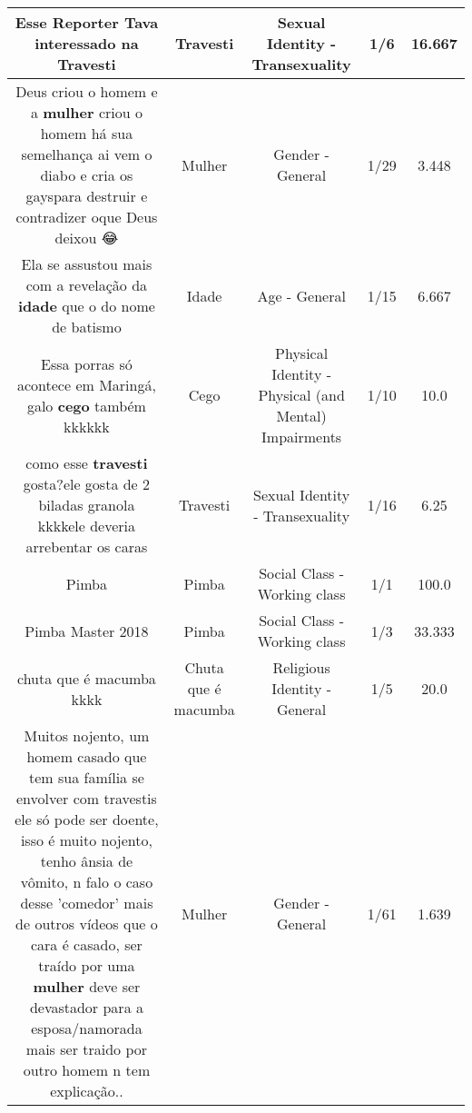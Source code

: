 \documentclass[11pt]{article}
\newlength\mylength
\begin{document}
\begin{center}
\begin{longtable}{|C{.65\mylength}|C{.30\mylength}|C{.12\mylength}|C{.12\mylength}|C{.12\mylength}|}
  \small Esse Reporter Tava interessado na Travesti\normalsize   & Travesti & Sexual Identity - Transexuality & 1/6 & 16.667 \\  \hline
  \small Deus criou o homem e  a \textbf{mulher} criou o homem há sua semelhança ai vem o diabo e cria os gayspara destruir e contradizer oque Deus deixou 😂\normalsize   & Mulher & Gender - General & 1/29 & 3.448 \\  \hline
  \small Ela se assustou mais com a revelação da \textbf{idade} que o do nome de batismo\normalsize   & Idade & Age - General & 1/15 & 6.667 \\  \hline
  \small Essa porras só acontece em Maringá, galo \textbf{cego} também kkkkkk\normalsize   & Cego & Physical Identity - Physical (and Mental) Impairments & 1/10 & 10.0 \\  \hline
  \small como esse \textbf{travesti} gosta?ele gosta de 2 biladas granola kkkkele deveria arrebentar os caras\normalsize   & Travesti & Sexual Identity - Transexuality & 1/16 & 6.25 \\  \hline
  \small Pimba\normalsize   & Pimba & Social Class - Working class & 1/1 & 100.0 \\  \hline
  \small Pimba Master 2018\normalsize   & Pimba & Social Class - Working class & 1/3 & 33.333 \\  \hline
  \small chuta que é macumba kkkk\normalsize   & Chuta que é macumba & Religious Identity - General & 1/5 & 20.0 \\  \hline
  \small Muitos nojento, um homem casado que tem sua família se envolver com travestis ele só pode ser doente, isso é muito nojento, tenho ânsia de vômito, n falo o caso desse 'comedor' mais de outros vídeos que o cara é casado, ser traído por uma \textbf{mulher} deve ser devastador para a esposa/namorada mais ser traido por outro homem n tem explicação..\normalsize   & Mulher & Gender - General & 1/61 & 1.639 \\  \hline

\end{longtable}
\end{center}
\end{document}

